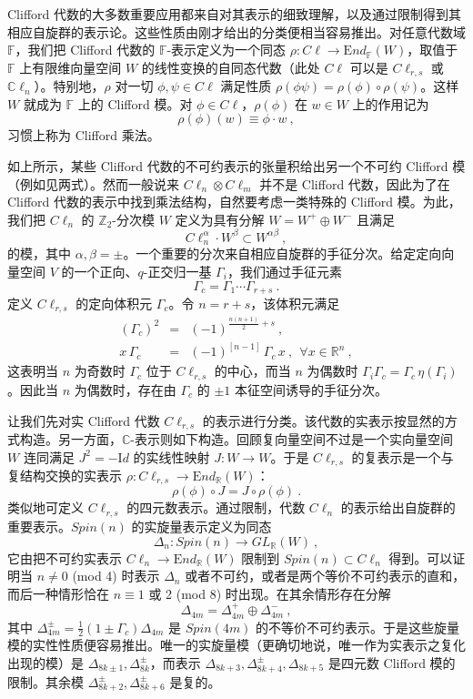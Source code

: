 \documentclass[11pt,a4paper]{ctexart}
\begin{document}
Clifford 代数的大多数重要应用都来自对其表示的细致理解，以及通过限制得到其相应自旋群的表示论。这些性质由刚才给出的分类便相当容易推出。对任意代数域 \({\mathbb{F}}\)，我们把 Clifford 代数的 \({\mathbb{F}}\)-表示定义为一个同态 \(\rho: C\ell\longrightarrow
{\mathrm End}_{\mathbb{F}}(W)\)，取值于 \({\mathbb{F}}\) 上有限维向量空间 \(W\) 的线性变换的自同态代数（此处 \(C\ell\) 可以是 \(C\ell_{r,s}\) 或 \({\mathbb{C}}\ell_n\)）。特别地，\(\rho\) 对一切 \(\phi,\psi\in C\ell\) 满足性质 \(\rho(\phi\psi)=\rho(\phi)\circ\rho(\psi)\)。这样 \(W\) 就成为 \({\mathbb{F}}\) 上的 Clifford 模。对 \(\phi\in C\ell\)，\(\rho(\phi)\) 在 \(w\in W\) 上的作用记为 \[\rho(\phi)(w)\equiv\phi\cdot w\ ,\] 习惯上称为 Clifford 乘法。

如上所示，某些 Clifford 代数的不可约表示的张量积给出另一个不可约 Clifford 模（例如见两式）。然而一般说来 \(C\ell_n\otimes C\ell_m\) 并不是 Clifford 代数，因此为了在 Clifford 代数的表示中找到乘法结构，自然要考虑一类特殊的 Clifford 模。为此，我们把 \(C\ell_n\) 的 \({\mathbb{Z}}_2\)-分次模 \(W\) 定义为具有分解 \(W=W^+\oplus W^-\) 且满足 \[C\ell_n^{\alpha}\cdot W^{\beta}\subset W^{\alpha\beta}\ ,\] 的模，其中 \(\alpha,\beta=\pm\)。一个重要的分次来自相应自旋群的手征分次。给定定向向量空间 \(V\) 的一个正向、\(q\)-正交归一基 \(\Gamma_i\)，我们通过手征元素 \[\Gamma_c=\Gamma_1\cdots\Gamma_{r+s}\ .\] 定义 \(C\ell_{r,s}\) 的定向体积元 \(\Gamma_c\)。令 \(n=r+s\)，该体积元满足 \[\begin{matrix}
(\Gamma_c)^2&=&(-1)^{\frac{n(n+1)}{2}+s}\ ,\\
x\,\Gamma_c&=&(-1)^[n-1]\,\Gamma_c\,x \ , \ \ \forall x\in{\mathbb{R}}^n\ ,
\end{matrix}\] 这表明当 \(n\) 为奇数时 \(\Gamma_c\) 位于 \(C\ell_{r,s}\) 的中心，而当 \(n\) 为偶数时 \(\Gamma_i\Gamma_c=\Gamma_c
\,\eta(\Gamma_i)\)。因此当 \(n\) 为偶数时，存在由 \(\Gamma_c\) 的 \(\pm 1\) 本征空间诱导的手征分次。

让我们先对实 Clifford 代数 \(C\ell_{r,s}\) 的表示进行分类。该代数的实表示按显然的方式构造。另一方面，\({\mathbb{C}}\)-表示则如下构造。回顾复向量空间不过是一个实向量空间 \(W\) 连同满足 \(J^2=-{\mathrm Id}\) 的实线性映射 \(J:W\rightarrow W\)。于是 \(C\ell_{r,s}\) 的复表示是一个与复结构交换的实表示 \(\rho: C\ell_{r,s}\rightarrow {\mathrm
End}_{{\mathbb{R}}}(W)\)： \[\rho(\phi)\circ J=J\circ\rho(\phi)\ .\] 类似地可定义 \(C\ell_{r,s}\) 的四元数表示。通过限制，代数 \(C\ell_n\) 的表示给出自旋群的重要表示。\(Spin(n)\) 的实旋量表示定义为同态 \[\Delta_n: Spin(n)\longrightarrow GL_{\mathbb{R}}(W)\ ,\] 它由把不可约实表示 \(C\ell_n\rightarrow{\mathrm End}_{{\mathbb{R}}}(W)\) 限制到 \(Spin(n)\subset C\ell_n\) 得到。可以证明当 \(n\neq 0\) (mod 4) 时表示 \(\Delta_n\) 或者不可约，或者是两个等价不可约表示的直和，而后一种情形恰在 \(n\equiv 1\) 或 2 (mod 8) 时出现。在其余情形存在分解 \[\Delta_{4m}=\Delta_{4m}^+\oplus\Delta_{4m}^-\ ,\] 其中 \(\Delta_{4m}^{\pm}=\frac12(1\pm\Gamma_c)\Delta_{4m}\) 是 \(Spin(4m)\) 的不等价不可约表示。于是这些旋量模的实性性质便容易推出。唯一的实旋量模（更确切地说，唯一作为实表示之复化出现的模）是 \(\Delta_{8k\pm1},\Delta_{8k}^\pm\)，而表示 \(\Delta_{8k+3},\Delta_{8k+4}^\pm,\Delta_{8k+5}\) 是四元数 Clifford 模的限制。其余模 \(\Delta_{8k+2}^\pm,\Delta_{8k+6}^\pm\) 是复的。
\end{document}
